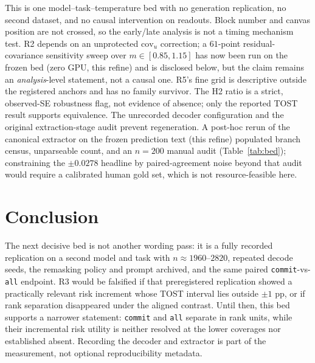 \documentclass{article}
\begin{document}
This is one model--task--temperature bed with no generation replication, no second dataset, and
no causal intervention on readouts.  Block number and canvas position are not crossed, so the
early/late analysis is not a timing mechanism test.  R2 depends on an unprotected
$\mathrm{cov}_u$ correction; a $61$-point residual-covariance sensitivity sweep over
$m\in[0.85,1.15]$ has now been run on the frozen bed (zero GPU, this refine) and is disclosed
below, but the claim remains an \emph{analysis}-level statement, not a causal one.  R5's fine
grid is descriptive outside the registered anchors and has no family survivor.  The H2 ratio is a strict, observed-SE robustness flag, not evidence of absence;
only the reported TOST result supports equivalence.  The unrecorded decoder configuration and
the original extraction-stage audit prevent regeneration.  A post-hoc rerun of the canonical
extractor on the frozen prediction text (this refine) populated branch census, unparseable
count, and an $n=200$ manual audit (Table~\ref{tab:bed}); constraining the $\pm 0.0278$
headline by paired-agreement noise beyond that audit would require a calibrated human gold
set, which is not resource-feasible here.

\section{Conclusion}
\label{sec:conclusion}

The next decisive bed is not another wording pass: it is a fully recorded replication on a
second model and task with $n\approx1960$--$2820$, repeated decode seeds, the remasking policy and
prompt archived, and the same paired \texttt{commit}-vs-\texttt{all} endpoint.  R3 would be
falsified if that preregistered replication showed a practically relevant risk increment whose
TOST interval lies outside $\pm1$ pp, or if rank separation disappeared under the aligned
contrast.  Until then, this bed supports a narrower statement: \texttt{commit} and \texttt{all}
separate in rank units, while their incremental risk utility is neither resolved at the lower
coverages nor established absent.  Recording the decoder and extractor is part of the
measurement, not optional reproducibility metadata.
\end{document}
